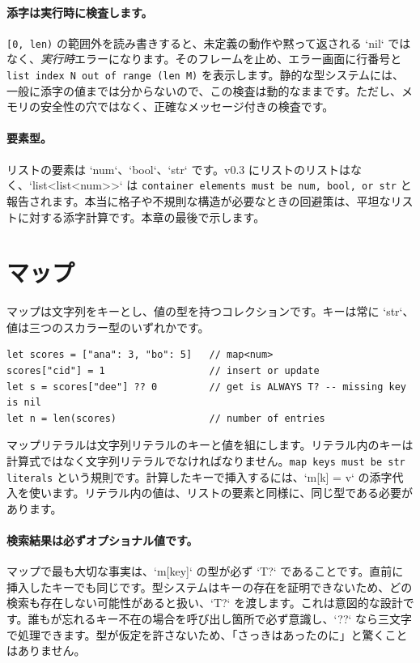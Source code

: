 \paragraph{添字は実行時に検査します。} \texttt{[0, len)} の範囲外を読み書きすると、未定義の動作や黙って返される `nil` ではなく、\emph{実行時}エラーになります。そのフレームを止め、エラー画面に行番号と \texttt{list index N out of range (len M)} を表示します。静的な型システムには、一般に添字の値までは分からないので、この検査は動的なままです。ただし、メモリの安全性の穴ではなく、正確なメッセージ付きの検査です。

\paragraph{要素型。} リストの要素は `num`、`bool`、`str` です。v0.3 にリストのリストはなく、`list<list<num>>` は \texttt{container elements must be num, bool, or str} と報告されます。本当に格子や不規則な構造が必要なときの回避策は、平坦なリストに対する添字計算です。本章の最後で示します。

\section{マップ}

マップは文字列をキーとし、値の型を持つコレクションです。キーは常に `str`、値は三つのスカラー型のいずれかです。

\begin{lstlisting}[language=wick]
let scores = ["ana": 3, "bo": 5]   // map<num>
scores["cid"] = 1                  // insert or update
let s = scores["dee"] ?? 0         // get is ALWAYS T? -- missing key is nil
let n = len(scores)                // number of entries
\end{lstlisting}

\noindent
マップリテラルは文字列リテラルのキーと値を組にします。リテラル内のキーは計算式ではなく文字列リテラルでなければなりません。\texttt{map keys must be str literals} という規則です。計算したキーで挿入するには、`m[k] = v` の添字代入を使います。リテラル内の値は、リストの要素と同様に、同じ型である必要があります。

\paragraph{検索結果は必ずオプショナル値です。} マップで最も大切な事実は、`m[key]` の型が必ず `T?` であることです。直前に挿入したキーでも同じです。型システムはキーの存在を証明できないため、どの検索も存在しない可能性があると扱い、`T?` を渡します。これは意図的な設計です。誰もが忘れるキー不在の場合を呼び出し箇所で必ず意識し、`??` なら三文字で処理できます。型が仮定を許さないため、「さっきはあったのに」と驚くことはありません。

